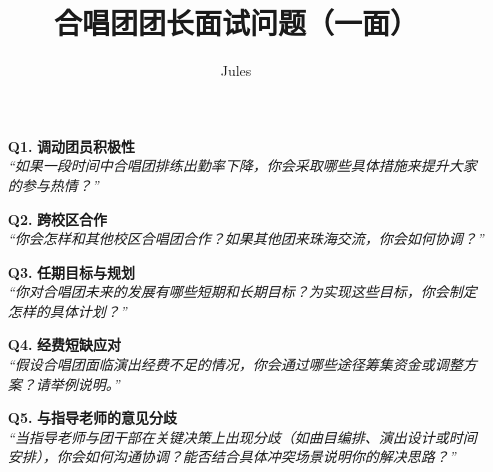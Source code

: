 \documentclass{article}
\title{合唱团团长面试问题（一面）}
\author{Jules}
\date{}
\begin{document}
\maketitle

\begin{itemize}[leftmargin=*, itemsep=20pt]
    \item[\textbf{Q1.}] \textcolor{questioncolor}{\textbf{调动团员积极性}} \\
    \textit{“如果一段时间中合唱团排练出勤率下降，你会采取哪些具体措施来提升大家的参与热情？”}
    
    \item[\textbf{Q2.}] \textcolor{questioncolor}{\textbf{跨校区合作}} \\
    \textit{“你会怎样和其他校区合唱团合作？如果其他团来珠海交流，你会如何协调？”}
    
    \item[\textbf{Q3.}] \textcolor{questioncolor}{\textbf{任期目标与规划}} \\
    \textit{“你对合唱团未来的发展有哪些短期和长期目标？为实现这些目标，你会制定怎样的具体计划？”}
    
    \item[\textbf{Q4.}] \textcolor{questioncolor}{\textbf{经费短缺应对}} \\
    \textit{“假设合唱团面临演出经费不足的情况，你会通过哪些途径筹集资金或调整方案？请举例说明。”}
    
    \item[\textbf{Q5.}] \textcolor{questioncolor}{\textbf{与指导老师的意见分歧}} \\
    \textit{“当指导老师与团干部在关键决策上出现分歧（如曲目编排、演出设计或时间安排），你会如何沟通协调？能否结合具体冲突场景说明你的解决思路？”}
\end{itemize}
\end{document}
